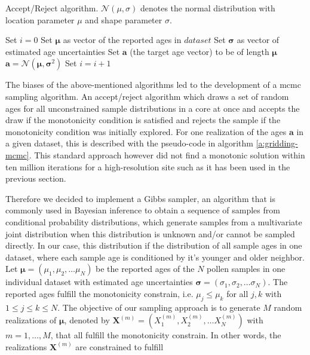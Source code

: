 \begin{refsection}
\begin{algorithm}[h]
\renewcommand{\algorithmicensure}{\textbf{Output:}}
\caption[Accept/Reject algorithm]{Accept/Reject algorithm. $\mathcal{N}(\mu, \sigma)$ denotes the normal distribution with location parameter $\mu$ and shape parameter $\sigma$.}
\label{a:gridding-mcmc}
\begin{algorithmic}[1]
	\STATE Set $i = 0$
	\STATE Set $\boldsymbol{\mu}$ as vector of the reported ages in $dataset$
	\STATE Set $\boldsymbol{\sigma}$ as vector of estimated age uncertainties		
	\STATE Set $\mathbf{a}$ (the target age vector) to be of length $\boldsymbol{\mu}$
	\STATE $\mathbf{a} = \mathcal{N}(\boldsymbol{\mu}, \boldsymbol{\sigma}^2)$
	\STATE Set $i = i + 1$
	\ENDWHILE
\end{algorithmic}
\end{algorithm}

The biases of the above-mentioned algorithms led to the development of a \gls{mcmc} sampling algorithm. An accept/reject algorithm which draws a set of random ages for all unconstrained sample distributions in a core at once and accepts the draw if the monotonicity condition is satisfied and rejects the sample if the monotonicity condition was initially explored. For one realization of the ages $\mathbf{a}$ in a given dataset, this is described with the pseudo-code in algorithm \ref{a:gridding-mcmc}. This standard approach however did not find a monotonic solution within ten million iterations for a high-resolution site such as it has been used in the previous section. 

Therefore we decided to implement a Gibbs sampler, an algorithm that is commonly used in Bayesian inference to obtain a sequence of samples from conditional probability distributions, which generate samples from a multivariate joint distribution when this distribution is unknown and/or cannot be sampled directly. In our case, this distribution if the distribution of all sample ages in one dataset, where each sample age is conditioned by it's younger and older neighbor. Let $\boldsymbol{\mu} = \left(\mu_1, \mu_2, \ldots \mu_N \right)$ be the reported ages of the $N$ pollen samples in one individual dataset with estimated age uncertainties $\boldsymbol{\sigma} = \left(\sigma_1, \sigma_2, \ldots \sigma_N \right)$. The reported ages fulfill the monotonicity constrain, i.e. $\mu_j \leq \mu_k$ for all $j, k$ with $1 \leq j \leq k \leq N$. The objective of our sampling approach is to generate $M$ random realizations of $\boldsymbol{\mu}$, denoted by $\mathbf{X}^{(m)} = \left(X^{(m)}_1, X^{(m)}_2, \ldots X^{(m)}_N \right)$ with $m=1,\ldots,M$, that all fulfill the monotonicity constrain. In other words, the realizations $\mathbf{X}^{(m)}$ are constrained to fulfill


\end{refsection}
